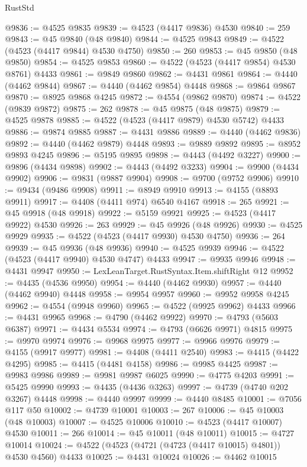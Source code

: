 \begin{lexlean}{RustStd}
\begin{coremodule}
{\begin{coremodule}
{{{{{{{{{{{{{{{{{{{{{{{{{{{{{{{{{{{{{{{{{{{{{{{{{{{{{{{{{{{{@9836 := @4525 @9835
@9839 := @4523 (@4417 @9836) @4530
@9840 := 259
@9843 := @45 @9840 (@48 @9840)
@9844 := @4525 @9843
@9849 := @4522 (@4523 (@4417 @9844) @4530 @4750)
@9850 := 260
@9853 := @45 @9850 (@48 @9850)
@9854 := @4525 @9853
@9860 := @4522 (@4523 (@4417 @9854) @4530 @8761) @4433
@9861 := @9849 @9860
@9862 := @4431 @9861
@9864 := @4440 (@4462 @9844)
@9867 := @4440 (@4462 @9854) @4448
@9868 := @9864 @9867
@9870 := @8925 @9868 @4245
@9872 := @4554 (@9862 @9870)
@9874 := @4522 (@9839 @9872)
@9875 := 262
@9878 := @45 @9875 (@48 @9875)
@9879 := @4525 @9878
@9885 := @4522 (@4523 (@4417 @9879) @4530 @5742) @4433
@9886 := @9874 @9885
@9887 := @4431 @9886
@9889 := @4440 (@4462 @9836)
@9892 := @4440 (@4462 @9879) @4448
@9893 := @9889 @9892
@9895 := @8952 @9893 @4245
@9896 := @5195 @9895
@9898 := @4443 (@4492 @3227)
@9900 := @9896 (@4434 @9898)
@9902 := @4443 (@4492 @3233)
@9904 := @9900 (@4434 @9902)
@9906 := @9831 (@9887 @9904)
@9908 := @9700 (@9752 @9906)
@9910 := @9434 (@9486 @9908)
@9911 := @8949 @9910
@9913 := @4155 (@8893 @9911)
@9917 := @4408 (@4411 @974) @6540 @4167
@9918 := 265
@9921 := @45 @9918 (@48 @9918)
@9922 := @5159 @9921
@9925 := @4523 (@4417 @9922) @4530
@9926 := 263
@9929 := @45 @9926 (@48 @9926)
@9930 := @4525 @9929
@9935 := @4522 (@4523 (@4417 @9930) @4530 @4750)
@9936 := 264
@9939 := @45 @9936 (@48 @9936)
@9940 := @4525 @9939
@9946 := @4522 (@4523 (@4417 @9940) @4530 @4747) @4433
@9947 := @9935 @9946
@9948 := @4431 @9947
@9950 := LexLeanTarget.RustSyntax.Item.shiftRight @12
@9952 := @4435 (@4536 @9950)
@9954 := @4440 (@4462 @9930)
@9957 := @4440 (@4462 @9940) @4448
@9958 := @9954 @9957
@9960 := @9952 @9958 @4245
@9962 := @4554 (@9948 @9960)
@9965 := @4522 (@9925 @9962) @4433
@9966 := @4431 @9965
@9968 := @4790 (@4462 @9922)
@9970 := @4793 (@5603 @6387)
@9971 := @4434 @5534
@9974 := @4793 (@6626 @9971) @4815
@9975 := @9970 @9974
@9976 := @9968 @9975
@9977 := @9966 @9976
@9979 := @4155 (@9917 @9977)
@9981 := @4408 (@4411 @2540)
@9983 := @4415 (@4422 @4295)
@9985 := @4415 (@4481 @4158)
@9986 := @9985 @4425
@9987 := @9983 @9986
@9989 := @9981 @9987 @6025
@9990 := @4775 @4203
@9991 := @5425 @9990
@9993 := @4435 (@4436 @3263)
@9997 := @4739 (@4740 @202 @3267) @4448
@9998 := @4440 @9997
@9999 := @4440 @8485
@10001 := @7056 @117 @50
@10002 := @4739 @10001
@10003 := 267
@10006 := @45 @10003 (@48 @10003)
@10007 := @4525 @10006
@10010 := @4523 (@4417 @10007) @4530
@10011 := 266
@10014 := @45 @10011 (@48 @10011)
@10015 := @4727 @10014
@10024 := @4522 (@4523 (@4721 (@4723 (@4417 @10015) @4801)) @4530 @4560) @4433
@10025 := @4431 @10024
@10026 := @4462 @10015
}}}}}}}}}}}}}}}}}}}}}}}}}}}}}}}}}}}}}}}}}}}}}}}}}}}}}}}}}}}}
\end{coremodule}}
\end{coremodule}
\end{lexlean}
